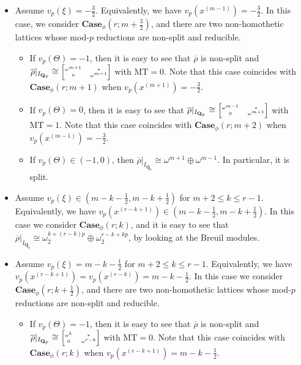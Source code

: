 \documentclass[11pt]{amsart}
\theoremstyle{definition}
\numberwithin{equation}{subsection}
\theoremstyle{plain}
\theoremstyle{plain}
\theoremstyle{plain}
\theoremstyle{plain}
\theoremstyle{plain}
\theoremstyle{plain}
\theoremstyle{plain}
\theoremstyle{plain}
\theoremstyle{plain}
\theoremstyle{plain}
\theoremstyle{plain}
\theoremstyle{plain}
\theoremstyle{definition}
\theoremstyle{definition}
\theoremstyle{definition}
\theoremstyle{remark}
\renewcommand{\(}{\textup{(}}
\renewcommand{\)}{\textup{)}}
\newcommand{\Q}{\mathbf{Q}}
\newcommand{\Qp}{\mathbf{Q}_p}
\newcommand{\rhobar}{\overline{\rho}}
\begin{document}
\begin{itemize}[leftmargin=*]
\item Assume $v_p(\xi)=-\frac{3}{2}$. Equivalently, we have $v_p(x^{(m-1)})=-\frac{3}{2}$. In this case, we consider $\mathbf{Case}_\phi(r;m+\frac{3}{2})$, and there are two non-homothetic lattices whose mod-$p$ reductions are non-split and reducible.
\begin{itemize}[leftmargin=*]
    \item If $v_p(\Theta)=-1$, then it is easy to see that $\rhobar$ is non-split and $\rhobar|_{I_{\Qp}}\cong
    \begin{tiny}\begin{bmatrix}
    \omega^{m+1} & * \\ 0 & \omega^{m-1}
    \end{bmatrix}\end{tiny}$ with $\mathrm{MT}=0$. Note that this case coincides with $\mathbf{Case}_\phi(r;m+1)$ when $v_p(x^{(m+1)})=-\frac{3}{2}$.
    \item If $v_p(\Theta)=0$, then it is easy to see that $\rhobar|_{I_{\Qp}}\cong
    \begin{tiny}\begin{bmatrix}
    \omega^{m-1} & * \\ 0 & \omega^{m+1}
    \end{bmatrix}\end{tiny}$ with $\mathrm{MT}=1$. Note that this case coincides with $\mathbf{Case}_\phi(r;m+2)$ when $v_p(x^{(m-1)})=-\frac{3}{2}$.
    \item If $v_p(\Theta)\in(-1,0)$, then $\rhobar|_{I_{\Q_p}}\cong \omega^{m+1}\oplus\omega^{m-1}$. In particular, it is split.
\end{itemize}
\item Assume $v_p(\xi)\in (m-k-\frac{1}{2},m-k+\frac{1}{2})$ for $m+2\leq k\leq r-1$. Equivalently, we have $v_p(x^{(r-k+1)})\in (m-k-\frac{1}{2},m-k+\frac{1}{2})$. In this case we consider $\mathbf{Case}_\phi(r;k)$, and it is easy to see that $\rhobar|_{I_{\Qp}}\cong\omega_2^{k+(r-k)p}\oplus\omega_2^{r-k+kp}$, by looking at the Breuil modules.
\item Assume $v_p(\xi)=m-k-\frac{1}{2}$ for $m+2\leq k\leq r-1$. Equivalently, we have $v_p(x^{(r-k+1)})=v_p(x^{(r-k)})=m-k-\frac{1}{2}$. In this case we consider $\mathbf{Case}_\phi(r;k+\frac{1}{2})$, and there are two non-homothetic lattices whose mod-$p$ reductions are non-split and reducible.
\begin{itemize}[leftmargin=*]
    \item If $v_p(\Theta)=-1$, then it is easy to see that $\rhobar$ is non-split and $\rhobar|_{I_{\Qp}}\cong
    \begin{tiny}\begin{bmatrix}
    \omega^{k} & * \\ 0 & \omega^{r-k}
    \end{bmatrix}\end{tiny}$ with $\mathrm{MT}=0$. Note that this case coincides with $\mathbf{Case}_\phi(r;k)$ when $v_p(x^{(r-k+1)})=m-k-\frac{1}{2}$.


\end{itemize}
\end{itemize}
\end{document}

